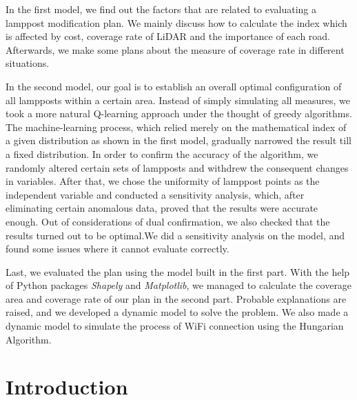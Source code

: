 \documentclass[12pt]{article}
\theoremstyle{definition}
\theoremstyle{remark}
\numberwithin{equation}{section}
\begin{document}
	In the first model, we find out the factors that are related to evaluating a lamppost modification plan. We mainly discuss how to calculate the index which is affected by cost, coverage rate of LiDAR and the importance of each road. Afterwards, we make some plans about the measure of coverage rate in different situations.
	
	In the second model, our goal is to establish an overall optimal configuration of all lampposts within a certain area. Instead of simply simulating all measures, we took a more natural Q-learning approach under the thought of greedy algorithms. The machine-learning process, which relied merely on the mathematical index of a given distribution as shown in the first model, gradually narrowed the result till a fixed distribution. In order to confirm the accuracy of the algorithm, we randomly altered certain sets of lampposts and withdrew the consequent changes in variables. After that, we chose the uniformity of lamppost points as the independent variable and conducted a sensitivity analysis, which, after eliminating certain anomalous data, proved that the results were accurate enough. Out of considerations of dual confirmation, we also checked that the results turned out to be optimal.We did a sensitivity analysis on the model, and found some issues where it cannot evaluate correctly.
	
	Last, we evaluated the plan using the model built in the first part. With the help of Python packages \textit{Shapely} and \textit{Matplotlib}, we managed to calculate the coverage area and coverage rate of our plan in the second part. Probable explanations are raised, and we developed a dynamic model to solve the problem. We also made a dynamic model to simulate the process of WiFi connection using the Hungarian Algorithm.

	\thispagestyle{empty}
	\maketitle
	\thispagestyle{empty}
	\newpage
	\clearpage
	\thispagestyle{empty}
	\tableofcontents %
	\newpage
	\pagestyle{fancy}
	\setcounter{page}{1}
	
	\newpage
	\section{Introduction}
\end{document}
